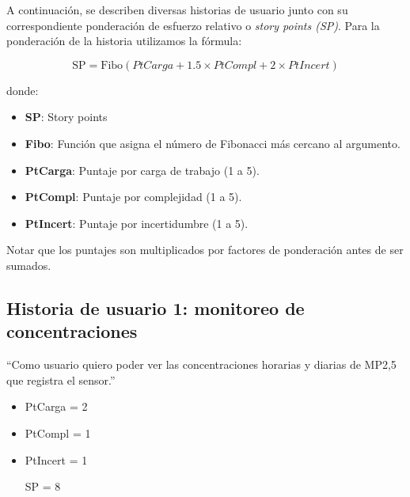 %
%


A continuación, se describen diversas historias de usuario junto con su correspondiente ponderación de esfuerzo relativo o \textit{story points (SP)}. Para la ponderación de la historia utilizamos la fórmula:

\[
\text{SP} = \text{Fibo}(PtCarga + 1.5 \times PtCompl + 2 \times PtIncert)
\]

donde:
\begin{itemize}
	\item \textbf{SP}: Story points
	\item \textbf{Fibo}: Función que asigna el número de Fibonacci más cercano al argumento.
	\item \textbf{PtCarga}: Puntaje por carga de trabajo (1 a 5).
	\item \textbf{PtCompl}: Puntaje por complejidad (1 a 5).
	\item \textbf{PtIncert}: Puntaje por incertidumbre (1 a 5).
\end{itemize}

Notar que los puntajes son multiplicados por factores de ponderación antes de ser sumados.

\subsection{Historia de usuario 1: monitoreo de concentraciones}
``Como usuario quiero poder ver las concentraciones horarias y diarias de MP2,5 que registra el sensor.''
\begin{itemize}
	\item PtCarga = 2
	\item PtCompl = 1
	\item PtIncert = 1
	\item [SP = 8]
\end{itemize}

